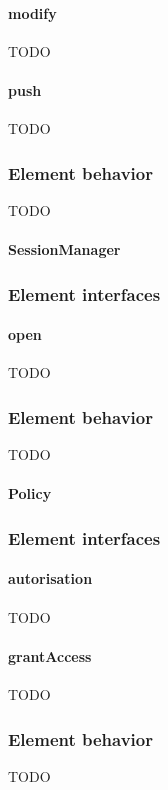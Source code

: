 \documentclass[a4paper,10pt]{book}
\begin{document}
\paragraph{modify}
TODO

\paragraph{push}
TODO

\subsubsection{Element behavior}
TODO

\paragraph{SessionManager}

\subsubsection{Element interfaces} 

\paragraph{open}
TODO

\subsubsection{Element behavior}
TODO

\paragraph{Policy}

\subsubsection{Element interfaces} 

\paragraph{autorisation}
TODO

\paragraph{grantAccess}
TODO

\subsubsection{Element behavior}
TODO
\end{document}
